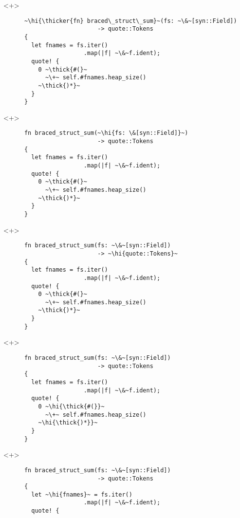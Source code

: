 \documentclass[usepdftitle=false]{beamer}
\renewcommand{\&}{\makebox[\widthof{\ampersand}][c]{\scalebox{0.9}[1.0]{\Book\ampersand}}}
\newcommand{\+}{\makebox[\widthof{+}][c]{\raisebox{-.2\height}{\scalefont{1.5}\Light+}}}
\newcommand{\thick}[1]{\contourlength{0.12pt}\contour[10]{black}{#1}}
\newcommand{\thicker}[1]{\contourlength{0.26pt}\contour[10]{black}{#1}}
\newcommand{\hi}[1]{%
\tikz[baseline=(A.base)]
 \node[highlighting=0,inner sep=0pt,text depth=0pt] (A) {#1};%
}
\begin{document}
\begin{frame}[fragile]
  \begin{onlyenv}<+>
    \begin{verbatim}
      ~\hi{\thicker{fn} braced\_struct\_sum}~(fs: ~\&~[syn::Field])
                           -> quote::Tokens
      {
        let fnames = fs.iter()
                       .map(|f| ~\&~f.ident);
        quote! {
          0 ~\thick{#(}~
            ~\+~ self.#fnames.heap_size()
          ~\thick{)*}~
        }
      }
    \end{verbatim}
  \end{onlyenv}
  \begin{onlyenv}<+>
    \begin{verbatim}
      fn braced_struct_sum(~\hi{fs: \&[syn::Field]}~)
                           -> quote::Tokens
      {
        let fnames = fs.iter()
                       .map(|f| ~\&~f.ident);
        quote! {
          0 ~\thick{#(}~
            ~\+~ self.#fnames.heap_size()
          ~\thick{)*}~
        }
      }
    \end{verbatim}
  \end{onlyenv}
  \begin{onlyenv}<+>
    \begin{verbatim}
      fn braced_struct_sum(fs: ~\&~[syn::Field])
                           -> ~\hi{quote::Tokens}~
      {
        let fnames = fs.iter()
                       .map(|f| ~\&~f.ident);
        quote! {
          0 ~\thick{#(}~
            ~\+~ self.#fnames.heap_size()
          ~\thick{)*}~
        }
      }
    \end{verbatim}
  \end{onlyenv}
  \begin{onlyenv}<+>
    \begin{verbatim}
      fn braced_struct_sum(fs: ~\&~[syn::Field])
                           -> quote::Tokens
      {
        let fnames = fs.iter()
                       .map(|f| ~\&~f.ident);
        quote! {
          0 ~\hi{\thick{#(}}~
            ~\+~ self.#fnames.heap_size()
          ~\hi{\thick{)*}}~
        }
      }
    \end{verbatim}
  \end{onlyenv}
  \begin{onlyenv}<+>
    \begin{verbatim}
      fn braced_struct_sum(fs: ~\&~[syn::Field])
                           -> quote::Tokens
      {
        let ~\hi{fnames}~ = fs.iter()
                       .map(|f| ~\&~f.ident);
        quote! {

\end{verbatim}
\end{onlyenv}
\end{frame}
\end{document}
